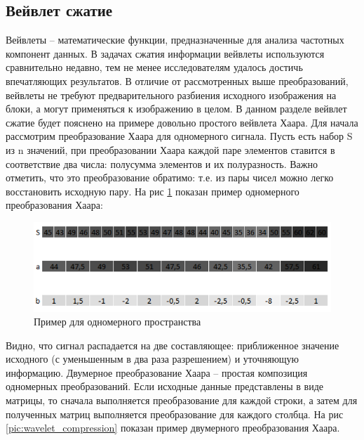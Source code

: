 \subsection*{Вейвлет сжатие}
Вейвлеты – математические функции, предназначенные для анализа частотных компонент данных. В задачах сжатия информации вейвлеты используются сравнительно недавно, тем не менее исследователям удалось достичь впечатляющих результатов.
В отличие от рассмотренных выше преобразований, вейвлеты не требуют предварительного разбиения исходного изображения на блоки, а могут применяться к изображению в целом. В данном разделе вейвлет сжатие будет пояснено на примере довольно простого вейвлета Хаара.
Для начала рассмотрим преобразование Хаара для одномерного сигнала. Пусть есть набор S из n значений, при преобразовании Хаара каждой паре элементов ставится в соответствие два числа: полусумма элементов и их полуразность. Важно отметить, что это преобразование обратимо: т.е. из пары чисел можно легко восстановить исходную пару. На рис \ref{pic:wavelet_example} показан пример одномерного преобразования Хаара:
\begin{figure}[H]
	\begin{center}
		\includegraphics[scale=0.9]{pics/wavelet/example.png}
		\caption{Пример для одномерного пространства} 
		\label{pic:wavelet_example}
	\end{center}
\end{figure}
Видно, что сигнал распадается на две составляющее: приближенное значение исходного (с уменьшенным в два раза разрешением) и уточняющую информацию.
Двумерное преобразование Хаара – простая композиция одномерных преобразований. Если исходные данные представлены в виде матрицы, то сначала выполняется преобразование для каждой строки, а затем для полученных матриц выполняется преобразование для каждого столбца. На рис \ref{pic:wavelet_compression} показан пример двумерного преобразования Хаара.

